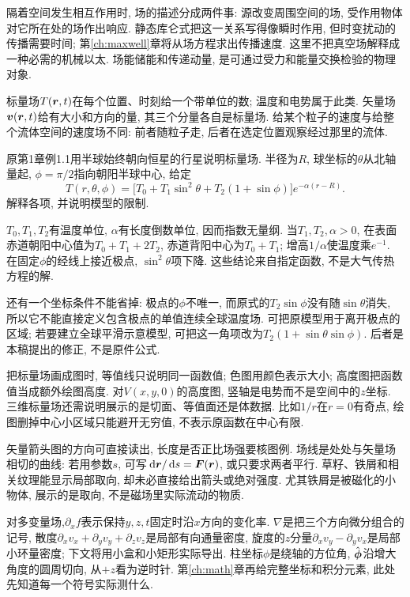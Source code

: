 \label{tb:fields}
隔着空间发生相互作用时, 场的描述分成两件事: 源改变周围空间的场, 受作用物体对它所在处的场作出响应. 静态库仑式把这一关系写得像瞬时作用, 但时变扰动的传播需要时间; 第\ref{ch:maxwell}章将从场方程求出传播速度. 这里不把真空场解释成一种必需的机械以太. 场能储能和传递动量, 是可通过受力和能量交换检验的物理对象.

标量场$T(\boldsymbol{r},t)$在每个位置、时刻给一个带单位的数; 温度和电势属于此类. 矢量场$\boldsymbol{v}(\boldsymbol{r},t)$给有大小和方向的量, 其三个分量各自是标量场. 给某个粒子的速度与给整个流体空间的速度场不同: 前者随粒子走, 后者在选定位置观察经过那里的流体.

\begin{example}\label{ex:planet}
原第1章例1.1用半球始终朝向恒星的行星说明标量场. 半径为$R$, 球坐标的$\theta$从北轴量起, $\phi=\pi/2$指向朝阳半球中心, 给定
\[
T(r,\theta,\phi)=\bigl[T_0+T_1\sin^2\theta+T_2(1+\sin\phi)\bigr]e^{-\alpha(r-R)}.
\]
解释各项, 并说明模型的限制.
\end{example}
\begin{solution}
$T_0,T_1,T_2$有温度单位, $\alpha$有长度倒数单位, 因而指数无量纲. 当$T_1,T_2,\alpha>0$, 在表面赤道朝阳中心值为$T_0+T_1+2T_2$, 赤道背阳中心为$T_0+T_1$; 增高$1/\alpha$使温度乘$e^{-1}$. 在固定$\phi$的经线上接近极点, $\sin^2\theta$项下降. 这些结论来自指定函数, 不是大气传热方程的解.

还有一个坐标条件不能省掉: 极点的$\phi$不唯一, 而原式的$T_2\sin\phi$没有随$\sin\theta$消失, 所以它不能直接定义包含极点的单值连续全球温度场. 可把原模型用于离开极点的区域; 若要建立全球平滑示意模型, 可把这一角项改为$T_2(1+\sin\theta\sin\phi)$. 后者是本稿提出的修正, 不是原件公式.
\end{solution}

把标量场画成图时, 等值线只说明同一函数值; 色图用颜色表示大小; 高度图把函数值当成额外绘图高度. 对$V(x,y,0)$的高度图, 竖轴是电势而不是空间中的$z$坐标. 三维标量场还需说明展示的是切面、等值面还是体数据. 比如$1/r$在$r=0$有奇点, 绘图删掉中心小区域只能避开无穷值, 不表示原函数在中心有限.

矢量箭头图的方向可直接读出, 长度是否正比场强要核图例. 场线是处处与矢量场相切的曲线: 若用参数$s$, 可写$\,\mathrm d\boldsymbol{r}/\,\mathrm d s=\boldsymbol{F}(\boldsymbol{r})$, 或只要求两者平行. 草籽、铁屑和相关纹理能显示局部取向, 却未必直接给出箭头或绝对强度. 尤其铁屑是被磁化的小物体, 展示的是取向, 不是磁场里实际流动的物质.

对多变量场,$\partial_xf$表示保持$y,z,t$固定时沿$x$方向的变化率. $\nabla$是把三个方向微分组合的记号, 散度$\partial_xv_x+\partial_yv_y+\partial_zv_z$是局部有向通量密度, 旋度的$z$分量$\partial_xv_y-\partial_yv_x$是局部小环量密度; 下文将用小盒和小矩形实际导出. 柱坐标$\phi$是绕轴的方位角, $\hat{\boldsymbol{\phi}}$沿增大角度的圆周切向, 从$+z$看为逆时针. 第\ref{ch:math}章再给完整坐标和积分元素, 此处先知道每一个符号实际测什么.

